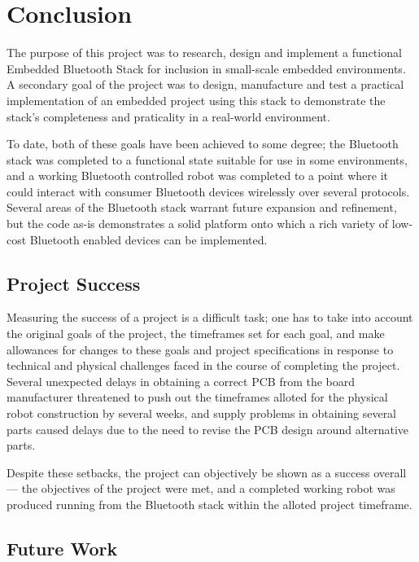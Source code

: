 \chapter{Conclusion}
\label{chp:conclusion}

The purpose of this project was to research, design and implement a functional Embedded Bluetooth Stack for inclusion in small-scale embedded environments. A secondary goal of the project was to design, manufacture and test a practical implementation of an embedded project using this stack to demonstrate the stack's completeness and praticality in a real-world environment.

To date, both of these goals have been achieved to some degree; the Bluetooth stack was completed to a functional state suitable for use in some environments, and a working Bluetooth controlled robot was completed to a point where it could interact with consumer Bluetooth devices wirelessly over several protocols. Several areas of the Bluetooth stack warrant future expansion and refinement, but the code as-is demonstrates a solid platform onto which a rich variety of low-cost Bluetooth enabled devices can be implemented.

\section{Project Success}

Measuring the success of a project is a difficult task; one has to take into account the original goals of the project, the timeframes set for each goal, and make allowances for changes to these goals and project specifications in response to technical and physical challenges faced in the course of completing the project. Several unexpected delays in obtaining a correct PCB from the board manufacturer threatened to push out the timeframes alloted for the physical robot construction by several weeks, and supply problems in obtaining several parts caused delays due to the need to revise the PCB design around alternative parts.

Despite these setbacks, the project can objectively be shown as a success overall --- the objectives of the project were met, and a completed working robot was produced running from the Bluetooth stack within the alloted project timeframe.

\section{Future Work}

